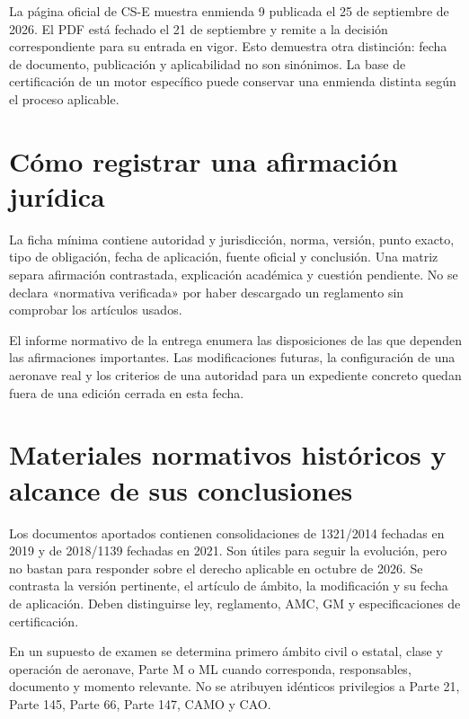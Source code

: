 La página oficial de CS-E muestra enmienda 9 publicada el 25 de septiembre de 2026. El PDF está fechado el 21 de septiembre y remite a la decisión correspondiente para su entrada en vigor. Esto demuestra otra distinción: fecha de documento, publicación y aplicabilidad no son sinónimos. La base de certificación de un motor específico puede conservar una enmienda distinta según el proceso aplicable.
\section{Cómo registrar una afirmación jurídica}
La ficha mínima contiene autoridad y jurisdicción, norma, versión, punto exacto, tipo de obligación, fecha de aplicación, fuente oficial y conclusión. Una matriz separa afirmación contrastada, explicación académica y cuestión pendiente. No se declara «normativa verificada» por haber descargado un reglamento sin comprobar los artículos usados.

El informe normativo de la entrega enumera las disposiciones de las que dependen las afirmaciones importantes. Las modificaciones futuras, la configuración de una aeronave real y los criterios de una autoridad para un expediente concreto quedan fuera de una edición cerrada en esta fecha.
\section{Materiales normativos históricos y alcance de sus conclusiones}
Los documentos aportados contienen consolidaciones de 1321/2014 fechadas en 2019 y de 2018/1139 fechadas en 2021. Son útiles para seguir la evolución, pero no bastan para responder sobre el derecho aplicable en octubre de 2026. Se contrasta la versión pertinente, el artículo de ámbito, la modificación y su fecha de aplicación. Deben distinguirse ley, reglamento, AMC, GM y especificaciones de certificación.

En un supuesto de examen se determina primero ámbito civil o estatal, clase y operación de aeronave, Parte M o ML cuando corresponda, responsables, documento y momento relevante. No se atribuyen idénticos privilegios a Parte 21, Parte 145, Parte 66, Parte 147, CAMO y CAO.


